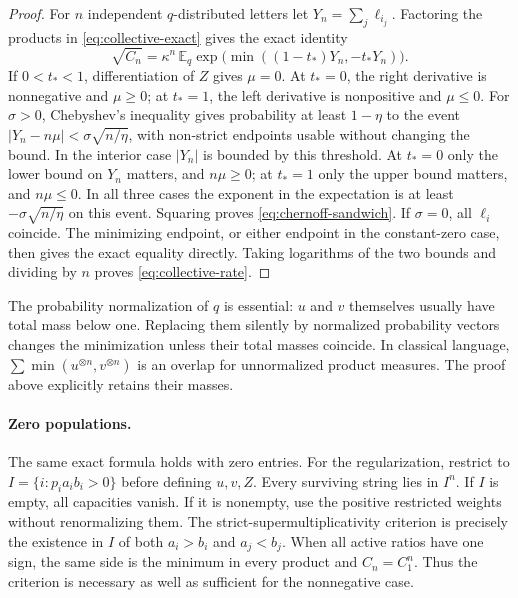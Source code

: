 \begin{proof}
For $n$ independent $q$-distributed letters let $Y_n=\sum_j\ell_{i_j}$.
Factoring the products in \eqref{eq:collective-exact} gives the exact identity
\[
 \sqrt{C_n}=\kappa^n\,
 \mathbb E_q\exp\bigl(\min((1-t_*)Y_n,-t_*Y_n)\bigr).
\]
If $0<t_*<1$, differentiation of $Z$ gives $\mu=0$.
At $t_*=0$, the right derivative is nonnegative and $\mu\ge0$;
at $t_*=1$, the left derivative is nonpositive and $\mu\le0$.
For $\sigma>0$, Chebyshev's inequality gives probability at least
$1-\eta$ to the event
$|Y_n-n\mu|<\sigma\sqrt{n/\eta}$, with non-strict endpoints usable
without changing the bound. In the interior case $|Y_n|$ is bounded by
this threshold. At $t_*=0$ only the lower bound on $Y_n$ matters, and
$n\mu\ge0$; at $t_*=1$ only the upper bound matters, and $n\mu\le0$.
In all three cases the exponent in the expectation is at least
$-\sigma\sqrt{n/\eta}$ on this event. Squaring proves
\eqref{eq:chernoff-sandwich}. If $\sigma=0$, all $\ell_i$ coincide.
The minimizing endpoint, or either endpoint in the constant-zero case,
then gives the exact equality directly. Taking logarithms of the two
bounds and dividing by $n$ proves \eqref{eq:collective-rate}.
\end{proof}

The probability normalization of $q$ is essential: $u$ and $v$ themselves
usually have total mass below one. Replacing them silently by normalized
probability vectors changes the minimization unless their total masses
coincide. In classical language, $\sum\min(u^{\otimes n},v^{\otimes n})$
is an overlap for unnormalized product measures. The proof above explicitly
retains their masses.

\paragraph{Zero populations.}
The same exact formula holds with zero entries. For the regularization,
restrict to $I=\{i:p_i a_i b_i>0\}$ before defining $u,v,Z$.
Every surviving string lies in $I^n$. If $I$ is empty, all capacities
vanish. If it is nonempty, use the positive restricted weights without
renormalizing them. The strict-supermultiplicativity criterion is precisely
the existence in $I$ of both $a_i>b_i$ and $a_j<b_j$.
When all active ratios have one sign, the same side is the minimum in
every product and $C_n=C_1^n$. Thus the criterion is necessary as well
as sufficient for the nonnegative case.

